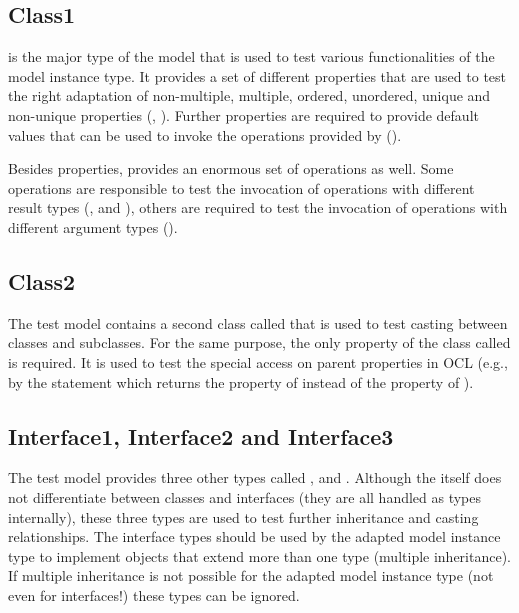 \subsection{Class1}

 is the major type of the model that is used to test various 
functionalities of the model instance type. It provides a set of different
properties that are used to test the right adaptation of non-multiple, 
multiple, ordered, unordered, unique and non-unique properties 
(, ). Further 
properties are required to provide default values that can be used to invoke 
the operations provided by  ().

Besides properties,  provides an enormous set of operations as 
well. Some operations are responsible to test the invocation of operations  with
different result types (,  
and ), others are required to test the invocation 
of operations with different argument types 
().


\subsection{Class2}

The test model contains a second class called  that is used to
test casting between classes and subclasses. For the same purpose, the only 
property of the class called  is required. 
It is used to test the special access on parent properties in \acs{OCL} (e.g., 
by the statement  which 
returns the property of  instead of the property of ).


\subsection{Interface1, Interface2 and Interface3}

The test model provides three other types called , 
 and . Although the 
itself does not differentiate between classes and interfaces (they are all 
handled as types internally), these three types are used to test further 
inheritance and casting relationships. The interface types should be used by 
the adapted model instance type to implement objects that extend more than one
type (multiple inheritance). If multiple inheritance is not possible for the 
adapted model instance type (not even for interfaces!) these types can be
ignored.



